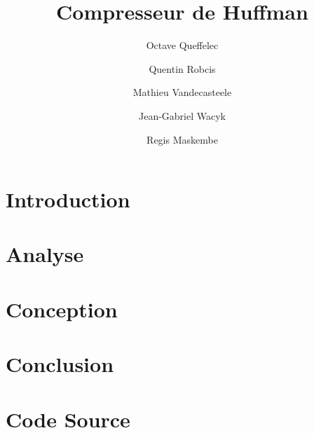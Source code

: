 \documentclass{article}
\title{Compresseur de Huffman}
\author{Octave Queffelec \and Quentin Robcis \and Mathieu Vandecasteele \and Jean-Gabriel Wacyk \and Regis Maskembe}
\begin{document}
\maketitle
\newpage


\tableofcontents
\newpage


\section{Introduction}


\newpage
\section{Analyse}


\newpage
\section{Conception}



\newpage
\section{Conclusion}


\newpage
\section{Code Source}

\end{document}
